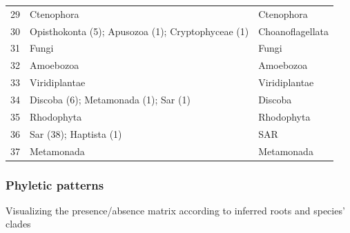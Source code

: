 \begin{table}[H]
\begin{tabular}[t]{rll}
\rowcolor{gray!6}  29 & Ctenophora & Ctenophora\\
30 & Opisthokonta (5); Apusozoa (1); Cryptophyceae (1) & Choanoflagellata\\
\rowcolor{gray!6}  31 & Fungi & Fungi\\
32 & Amoebozoa & Amoebozoa\\
\rowcolor{gray!6}  33 & Viridiplantae & Viridiplantae\\
34 & Discoba (6); Metamonada (1); Sar (1) & Discoba\\
\rowcolor{gray!6}  35 & Rhodophyta & Rhodophyta\\
36 & Sar (38); Haptista (1) & SAR\\
\rowcolor{gray!6}  37 & Metamonada & Metamonada\\
\bottomrule
\end{tabular}
\end{table}

\hypertarget{phyletic-patterns}{%
\subsubsection{Phyletic patterns}\label{phyletic-patterns}}

Visualizing the presence/absence matrix according to inferred roots and
species' clades

